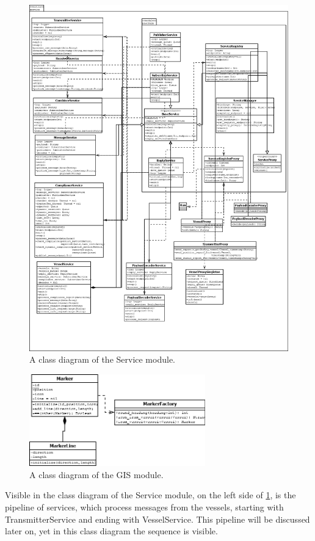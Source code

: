 \documentclass[12pt]{article}
\begin{document}
\begin{figure}
  \centering
  \includegraphics[width=5in]{lib_service_total}
  \caption{A class diagram of the Service module.}
  \label{lib_service_total}
\end{figure}

\begin{figure}
  \centering
  \includegraphics[width=3in]{lib_gis_total}
  \caption{A class diagram of the GIS module.}
  \label{lib_gis_total}
\end{figure}

Visible in the class diagram of the Service module, on the left side of \ref{lib_service_total}, is the pipeline of services, which process messages from the vessels, starting with TransmitterService and ending with VesselService. This pipeline will be discussed later on, yet in this class diagram the sequence is visible.
\end{document}
